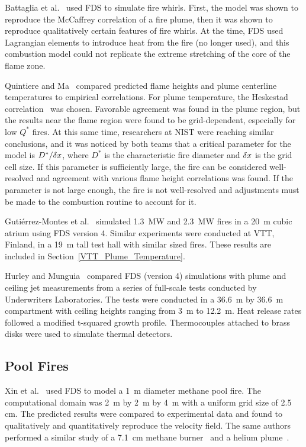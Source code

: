 Battaglia et al.~\cite{Battaglia:1} used FDS to simulate fire whirls.  First, the model was shown to reproduce the McCaffrey correlation of a fire plume,  then it was shown to reproduce qualitatively certain features of fire whirls. At the time, FDS used Lagrangian elements to introduce heat from the fire (no longer used), and this combustion model could not replicate the extreme stretching of the core of the flame zone.

Quintiere and Ma~\cite{Ma:2,Ma:3} compared predicted flame heights and plume centerline temperatures to empirical correlations.  For plume temperature,  the Heskestad  correlation~\cite{SFPE:Heskestad} was chosen. Favorable agreement was found in the plume region, but the results near the flame region were found to be grid-dependent, especially for low $Q^*$ fires. At this same time, researchers at NIST were reaching similar conclusions, and it was noticed by both teams that a critical parameter for the model is $D^*/\delta x$, where $D^*$ is the characteristic fire diameter and $\delta x$ is the grid cell size. If this parameter is sufficiently large, the fire can be considered well-resolved and agreement with various flame height correlations was found. If the parameter is not large enough, the fire is not well-resolved and adjustments must be made to the combustion routine to account for it.

Guti\'{e}rrez-Montes et al.~\cite{Gutierrez:Building_and_Environment} simulated 1.3~MW and 2.3~MW fires in a 20~m cubic atrium using FDS version 4. Similar experiments were conducted at VTT, Finland, in a 19~m tall test hall with similar sized fires. These results are included in Section~\ref{VTT_Plume_Temperature}.

Hurley and Munguia~\cite{Hurley:GCR09-921,Hurley:JFPE2009} compared FDS (version 4) simulations with plume and ceiling jet measurements from a series of full-scale tests conducted by Underwriters Laboratories. The tests were conducted in a 36.6~m by 36.6~m compartment with ceiling heights ranging from 3~m to 12.2~m. Heat release rates followed a modified t-squared growth profile. Thermocouples attached to brass disks were used to simulate thermal detectors.


\subsection{Pool Fires}

Xin et al.~\cite{Xin:JSS2005} used FDS to model a 1~m diameter methane pool fire. The computational domain was 2~m by 2~m by 4~m with a uniform grid size of 2.5 cm. The predicted results were compared to  experimental data and found  to qualitatively and quantitatively reproduce  the velocity field.  The same authors performed a similar study of a 7.1~cm methane burner~\cite{Xin:CF2005} and a helium plume~\cite{Xin:CS2002}.

